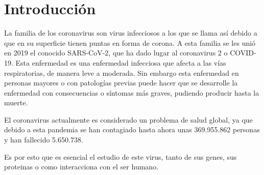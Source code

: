 \section{Introducción}
La familia de los coronavirus son virus infecciosos a los que se llama así debido a que en su superficie tienen puntas en forma de corona. A esta familia se les unió en 2019 el conocido SARS-CoV-2, que ha dado lugar al coronavirus 2 o COVID-19. Esta enfermedad es una enfermedad infecciosa que afecta a las vías respiratorias, de manera leve a moderada. Sin embargo esta enfermedad en personas mayores o con patologías previas puede hacer que se desarrolle la enfermedad con consecuencias o síntomas más graves, pudiendo producir hasta la muerte.

El coronavirus actualmente es considerado un problema de salud global, ya que debido a esta pandemia se han contagiado hasta ahora unas 369.955.862 personas y han fallecido 5.650.738. 

Es por esto que es esencial el estudio de este virus, tanto de sus genes, sus proteinas o como interacciona con el ser humano. 